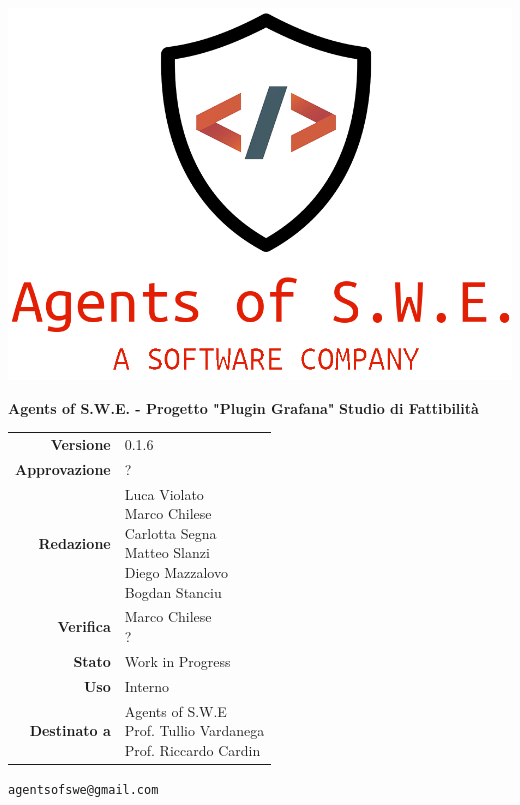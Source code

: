 


\begin{titlepage}
\thispagestyle{empty}

\begin{center}

\includegraphics[scale=0.3]{./images/logo.png} 

\large \textbf{Agents of S.W.E. - Progetto "Plugin Grafana"}
\vfill
\Huge \textbf{Studio di Fattibilità}
\vfill
\large
\renewcommand{\arraystretch}{1.3}
\begin{tabular}{r|l}
\textbf{Versione} & 0.1.6\\
\textbf{Approvazione} & ?\\
\textbf{Redazione} & \parbox[t]{5cm}{Luca Violato\\Marco Chilese\\Carlotta Segna\\Matteo Slanzi\\Diego Mazzalovo\\Bogdan Stanciu}\\
\textbf{Verifica} & \parbox[t]{5cm}{Marco Chilese\\?}\\
\textbf{Stato} & Work in Progress\\
\textbf{Uso} & Interno\\
\textbf{Destinato a} & \parbox[t]{5cm}{Agents of S.W.E \\Prof. Tullio Vardanega\\Prof. Riccardo Cardin}
\end{tabular}
\vfill
\small
\texttt{agentsofswe@gmail.com}
\end{center}
\end{titlepage}

